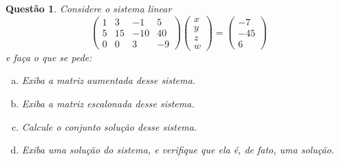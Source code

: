 \documentclass[a4paper,12pt]{article}
\newtheorem{qst}{Questão}
\begin{document}
\begin{qst}
Considere o sistema linear
\[\begin{pmatrix}
1&3&-1&5\\5&15&-10&40\\0&0&3&-9
\end{pmatrix}\begin{pmatrix}x\\y\\z\\w
\end{pmatrix}=\begin{pmatrix}
-7\\-45\\6
\end{pmatrix}\]e faça o que se pede:
\begin{enumerate}[a)]
	\item Exiba a matriz aumentada desse sistema.
	\item Exiba a matriz escalonada desse sistema.
	\item Calcule o conjunto solução desse sistema.
	\item Exiba uma solução do sistema, e verifique que ela é, de fato, uma solução.
\end{enumerate}
\end{qst}
\end{document}

